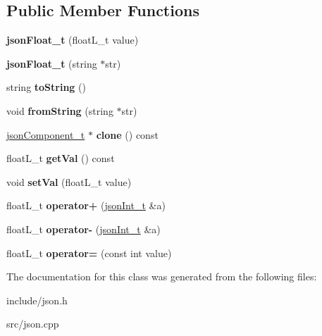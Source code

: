 \subsection*{\-Public \-Member \-Functions}
\begin{DoxyCompactItemize}
\item 
\hypertarget{classjsonFloat__t_aaa0a8fd8a422c876ac6b47183dfd87f9}{{\bfseries json\-Float\-\_\-t} (float\-L\-\_\-t value)}\label{classjsonFloat__t_aaa0a8fd8a422c876ac6b47183dfd87f9}

\item 
\hypertarget{classjsonFloat__t_a2cbcbc3903a36cb3f8b1de66d27b9530}{{\bfseries json\-Float\-\_\-t} (string $\ast$str)}\label{classjsonFloat__t_a2cbcbc3903a36cb3f8b1de66d27b9530}

\item 
\hypertarget{classjsonFloat__t_aff586362df2aaff2c46453e37d583b5b}{string {\bfseries to\-String} ()}\label{classjsonFloat__t_aff586362df2aaff2c46453e37d583b5b}

\item 
\hypertarget{classjsonFloat__t_ac2231cec183f94dec6f0528fe5cb7a03}{void {\bfseries from\-String} (string $\ast$str)}\label{classjsonFloat__t_ac2231cec183f94dec6f0528fe5cb7a03}

\item 
\hypertarget{classjsonFloat__t_a6dd7b8e65bc9d7954ecd9164715f4395}{\hyperlink{classjsonComponent__t}{json\-Component\-\_\-t} $\ast$ {\bfseries clone} () const }\label{classjsonFloat__t_a6dd7b8e65bc9d7954ecd9164715f4395}

\item 
\hypertarget{classjsonFloat__t_a2a5f0f98c70ead96bee27b98f8f0a0dd}{float\-L\-\_\-t {\bfseries get\-Val} () const }\label{classjsonFloat__t_a2a5f0f98c70ead96bee27b98f8f0a0dd}

\item 
\hypertarget{classjsonFloat__t_a8f0fbea2d08d672e1628c12b5a976324}{void {\bfseries set\-Val} (float\-L\-\_\-t value)}\label{classjsonFloat__t_a8f0fbea2d08d672e1628c12b5a976324}

\item 
\hypertarget{classjsonFloat__t_af0a4185a402a19c1aaa4513b3f150afc}{float\-L\-\_\-t {\bfseries operator+} (\hyperlink{classjsonInt__t}{json\-Int\-\_\-t} \&a)}\label{classjsonFloat__t_af0a4185a402a19c1aaa4513b3f150afc}

\item 
\hypertarget{classjsonFloat__t_aac343970a7de5ae462dd834660f93e71}{float\-L\-\_\-t {\bfseries operator-\/} (\hyperlink{classjsonInt__t}{json\-Int\-\_\-t} \&a)}\label{classjsonFloat__t_aac343970a7de5ae462dd834660f93e71}

\item 
\hypertarget{classjsonFloat__t_ab970a3203972b21c55dc8f71945f591c}{float\-L\-\_\-t {\bfseries operator=} (const int value)}\label{classjsonFloat__t_ab970a3203972b21c55dc8f71945f591c}

\end{DoxyCompactItemize}


\-The documentation for this class was generated from the following files\-:\begin{DoxyCompactItemize}
\item 
include/json.\-h\item 
src/json.\-cpp\end{DoxyCompactItemize}
